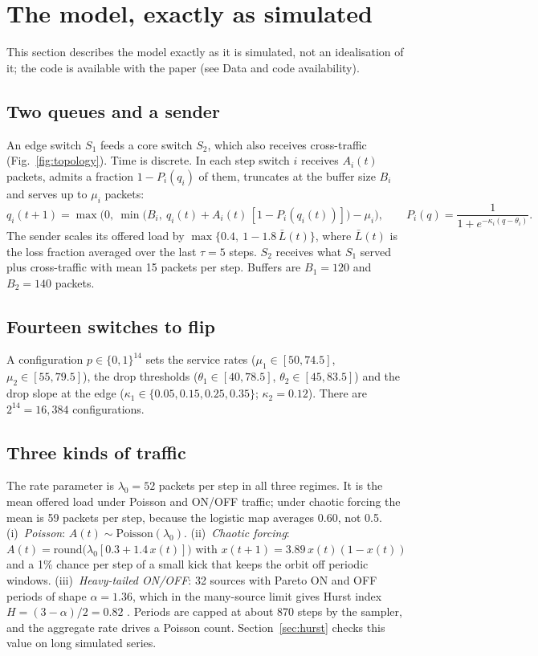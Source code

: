 \section{The model, exactly as simulated}
\label{sec:model}

This section describes the model exactly as it is simulated, not an idealisation of it; the code is available with the paper (see Data and code availability).

\subsection{Two queues and a sender}
An edge switch $S_1$ feeds a core switch $S_2$, which also receives cross-traffic (Fig.~\ref{fig:topology}). Time is discrete. In each step switch $i$ receives $A_i(t)$ packets, admits a fraction $1-P_i(q_i)$ of them, truncates at the buffer size $B_i$ and serves up to $\mu_i$ packets:
\begin{equation}
q_i(t+1) = \max\!\Big(0,\ \min\big(B_i,\ q_i(t) + A_i(t)\,[1-P_i(q_i(t))]\big) - \mu_i\Big),
\qquad
P_i(q) = \frac{1}{1+e^{-\kappa_i (q-\theta_i)}} .
\label{eq:queue}
\end{equation}
The sender scales its offered load by $\max\{0.4,\ 1-1.8\,\bar L(t)\}$, where $\bar L(t)$ is the loss fraction averaged over the last $\tau=5$ steps. $S_2$ receives what $S_1$ served plus cross-traffic with mean 15 packets per step. Buffers are $B_1=120$ and $B_2=140$ packets.

\subsection{Fourteen switches to flip}
A configuration $p\in\{0,1\}^{14}$ sets the service rates ($\mu_1\in[50,74.5]$, $\mu_2\in[55,79.5]$), the drop thresholds ($\theta_1\in[40,78.5]$, $\theta_2\in[45,83.5]$) and the drop slope at the edge ($\kappa_1\in\{0.05,0.15,0.25,0.35\}$; $\kappa_2=0.12$). There are $2^{14}=16{,}384$ configurations.

\subsection{Three kinds of traffic}
The rate parameter is $\lambda_0=52$ packets per step in all three regimes. It is the mean offered load under Poisson and ON/OFF traffic; under chaotic forcing the mean is 59 packets per step, because the logistic map averages 0.60, not 0.5.
(i)~\emph{Poisson}: $A(t)\sim\mathrm{Poisson}(\lambda_0)$.
(ii)~\emph{Chaotic forcing}: $A(t)=\mathrm{round}\big(\lambda_0[0.3+1.4\,x(t)]\big)$ with $x(t+1)=3.89\,x(t)(1-x(t))$ and a 1\% chance per step of a small kick that keeps the orbit off periodic windows.
(iii)~\emph{Heavy-tailed ON/OFF}: 32 sources with Pareto ON and OFF periods of shape $\alpha=1.36$, which in the many-source limit gives Hurst index $H=(3-\alpha)/2=0.82$ \citep{willinger1997selfsim}. Periods are capped at about 870 steps by the sampler, and the aggregate rate drives a Poisson count.
Section~\ref{sec:hurst} checks this value on long simulated series.

